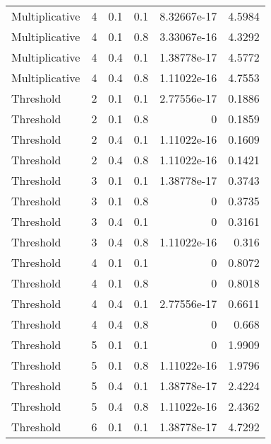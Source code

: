 \documentclass{article}
\begin{document}
\begin{figure}[H]
\begin{tabular}{lrrrrr}
 Multiplicative &       4 &   0.1 &            0.1 & 8.32667e-17 &            4.5984 \\
 Multiplicative &       4 &   0.1 &            0.8 & 3.33067e-16 &            4.3292 \\
 Multiplicative &       4 &   0.4 &            0.1 & 1.38778e-17 &            4.5772 \\
 Multiplicative &       4 &   0.4 &            0.8 & 1.11022e-16 &            4.7553 \\
 Threshold      &       2 &   0.1 &            0.1 & 2.77556e-17 &            0.1886 \\
 Threshold      &       2 &   0.1 &            0.8 & 0           &            0.1859 \\
 Threshold      &       2 &   0.4 &            0.1 & 1.11022e-16 &            0.1609 \\
 Threshold      &       2 &   0.4 &            0.8 & 1.11022e-16 &            0.1421 \\
 Threshold      &       3 &   0.1 &            0.1 & 1.38778e-17 &            0.3743 \\
 Threshold      &       3 &   0.1 &            0.8 & 0           &            0.3735 \\
 Threshold      &       3 &   0.4 &            0.1 & 0           &            0.3161 \\
 Threshold      &       3 &   0.4 &            0.8 & 1.11022e-16 &            0.316  \\
 Threshold      &       4 &   0.1 &            0.1 & 0           &            0.8072 \\
 Threshold      &       4 &   0.1 &            0.8 & 0           &            0.8018 \\
 Threshold      &       4 &   0.4 &            0.1 & 2.77556e-17 &            0.6611 \\
 Threshold      &       4 &   0.4 &            0.8 & 0           &            0.668  \\
 Threshold      &       5 &   0.1 &            0.1 & 0           &            1.9909 \\
 Threshold      &       5 &   0.1 &            0.8 & 1.11022e-16 &            1.9796 \\
 Threshold      &       5 &   0.4 &            0.1 & 1.38778e-17 &            2.4224 \\
 Threshold      &       5 &   0.4 &            0.8 & 1.11022e-16 &            2.4362 \\
 Threshold      &       6 &   0.1 &            0.1 & 1.38778e-17 &            4.7292 \\

\end{tabular}
\end{figure}
\end{document}
